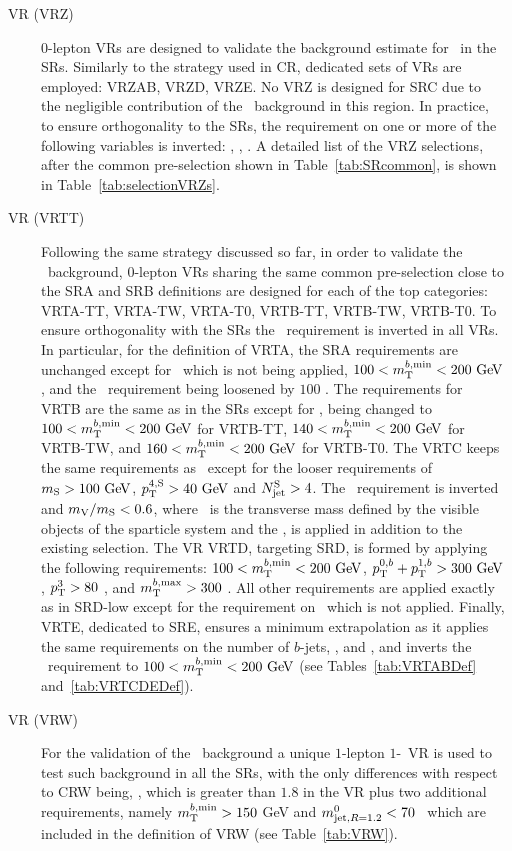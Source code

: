 			\begin{description}

				\item [\Zjets\ VR (VRZ)] $0$-lepton \acp{VR} are designed to validate the background estimate for \Zjets\ in the \acp{SR}. Similarly to the strategy used in \ac{CR}, dedicated sets of \acp{VR} are employed: VRZAB, VRZD, VRZE. No VRZ is designed for SRC due to the negligible contribution of the \Zboson\ background in this region. In practice, to ensure orthogonality to the \acp{SR}, the requirement on one or more of the following variables is inverted: \drbjetbjet, \mantikttwelvezero, \mantikteightzero. A detailed list of the VRZ selections, after the common pre-selection shown in Table~\ref{tab:SRcommon}, is shown in Table~\ref{tab:selectionVRZs}.

				\item [\ttbar\ VR (VRTT)] Following the same strategy discussed so far, in order to validate the \ttbar\ background, $0$-lepton \acp{VR} sharing the same common pre-selection close to the SRA and SRB definitions are designed for each of the top categories: VRTA-TT, VRTA-TW, VRTA-T0, VRTB-TT, VRTB-TW, VRTB-T0. To ensure orthogonality with the \acp{SR} the \mtbmin\ requirement is inverted in all \acp{VR}. In particular, for the definition of VRTA, the SRA requirements are unchanged except for \mttwo\, which is not being applied, $100<\mtbmin<200\gev$, and the \met\ requirement being loosened by $100$ \GeV. The requirements for VRTB are the same as in the \acp{SR} except for \mtbmin, being changed to $100<\mtbmin<200\gev$ for VRTB-TT, $140<\mtbmin<200\gev$ for VRTB-TW, and $160<\mtbmin<200\gev$ for VRTB-T0. The VRTC keeps the same requirements as \SRC\ except for the looser requirements of $\mS> 100\gev$, $\pTSFour>40\gev$ and $N_{\mathrm{jet}}^{\mathrm{S}} > 4$. The \dPhiISRMET\ requirement is inverted and $m_{\mathrm{V}}/m_{\mathrm{S}}<0.6$, where \mV\ is the transverse mass defined by the visible objects of the sparticle system and the \met, is applied in addition to the existing selection. The \ac{VR} VRTD, targeting SRD, is formed by applying the following requirements: $100<\mtbmin<200\gev$, $\ptbzero+\ptbone>300\gev$, $p_{\mathrm{T}}^{3}>80$ \GeV, and $m_{\mathrm{T}}^{b,\mathrm{max}}>300$ \GeV. All other requirements are applied exactly as in SRD-low except for the requirement on \ptfour\ which is not applied. Finally, VRTE, dedicated to SRE, ensures a minimum extrapolation as it applies the same requirements on the number of $b$-jets, \mantikteightzero, and \mantikteightone, and inverts the \mtbmin\ requirement to $100<\mtbmin<200\gev$ (see Tables~\ref{tab:VRTABDef} and~\ref{tab:VRTCDEDef}).

				\item [\Wjets\ VR (VRW)] For the validation of the \Wjets\ background a unique $1$-lepton $1$-\bj\ \ac{VR} is used to test such background in all the \acp{SR}, with the only differences with respect to CRW being, \mindrblep, which is greater than $1.8$ in the \ac{VR} plus two additional requirements, namely $m_{\mathrm{T}}^{b,\mathrm{min}}>150$ GeV and $m^{0}_{\mathrm{jet,}R=1.2}<70$ \GeV\ which are included in the definition of VRW (see Table~\ref{tab:VRW}).

			\end{description}

